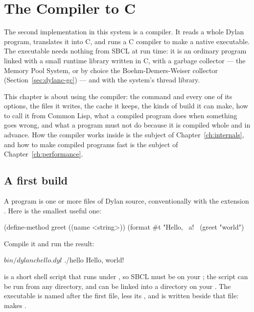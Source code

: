 \chapter{The Compiler to C}\label{ch:dylanc}
\sloppy

The second implementation in this system is a compiler. It reads a whole
Dylan program, translates it into C, and runs a C compiler to make a
native executable. The executable needs nothing from SBCL at run time: it
is an ordinary program linked with a small runtime library written in C,
with a garbage collector --- the Memory Pool System, or by choice the
Boehm-Demers-Weiser collector (Section~\ref{sec:dylanc-gc}) --- and
with the system's thread library.

This chapter is about using the compiler: the  command
and every one of its options, the files it writes, the cache it keeps,
the kinds of build it can make, how to call it from Common Lisp, what a
compiled program does when something goes wrong, and what a program must
not do because it is compiled whole and in advance. How the compiler
works inside is the subject of Chapter~\ref{ch:internals}, and how to
make compiled programs fast is the subject of
Chapter~\ref{ch:performance}.

\section{A first build}\label{sec:dylanc-first}

A program is one or more files of Dylan source, conventionally with the
extension . Here is the smallest useful one:

\begin{dylan}
(define-method greet ((name <string>))
  (format #t "Hello, ~a!~%
(greet "world")
\end{dylan}

Compile it and run the result:

\begin{shell}
$ bin/dylanc hello.dyl
$ ./hello
Hello, world!
\end{shell}

 is a short shell script that runs
 under , so SBCL must be
on your ; the script can be run from any directory, and can be
linked into a directory on your . The executable is named
after the first file, less its , and is written beside that
file:  makes .

